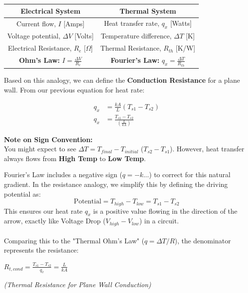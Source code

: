 \documentclass[11pt]{article}
\begin{document}
\begin{center}
    \renewcommand{\arraystretch}{1.5}
    \begin{tabular}{c | c }
        \textbf{Electrical System} & \textbf{Thermal System} \\
        \hline
        Current flow, $I$ [Amps] & Heat transfer rate, $q_x$ [Watts] \\
        Voltage potential, $\Delta V$ [Volts] & Temperature difference, $\Delta T$ [K] \\
        Electrical Resistance, $R_e$ [$\Omega$] & Thermal Resistance, $R_{th}$ [K/W] \\
        \hline
        \textbf{Ohm's Law:} $\displaystyle I = \frac{\Delta V}{R_e}$ & \textbf{Fourier's Law:} $\displaystyle q_x = \frac{\Delta T}{R_{th}}$
    \end{tabular}
\end{center}

\noindent Based on this analogy, we can define the \textbf{Conduction Resistance} for a plane wall. 
From our previous equation for heat rate:

\begin{align*}
    q_x &= \frac{kA}{L}(T_{s1} - T_{s2}) \\
    q_x &= \frac{T_{s1} - T_{s2}}{\left( \frac{L}{kA} \right)}
\end{align*}

\noindent \textbf{Note on Sign Convention:}\\ 
You might expect to see $\Delta T = T_{final} - T_{initial}$ ($T_{s2} - T_{s1}$). However, heat transfer always flows from \textbf{High Temp} to \textbf{Low Temp}. 

Fourier's Law includes a negative sign ($q = -k \dots$) to correct for this natural gradient. In the resistance analogy, we simplify this by defining the driving potential as:
\[
    \text{Potential} = T_{high} - T_{low} = T_{s1} - T_{s2}
\]
This ensures our heat rate $q_x$ is a positive value flowing in the direction of the arrow, exactly like Voltage Drop ($V_{high} - V_{low}$) in a circuit.
\\
\\
Comparing this to the "Thermal Ohm's Law" ($q = \Delta T / R$), the denominator represents the resistance:

\begin{center}
    \begin{eqnbox}
        $\displaystyle R_{t, cond} = \frac{T_{s1}-T_{s2}}{q_x} = \frac{L}{kA}$
    \end{eqnbox}
    \footnotesize\textit{(Thermal Resistance for Plane Wall Conduction)}
\end{center}
\end{document}
